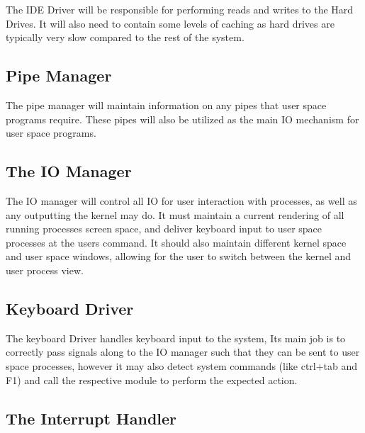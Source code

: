 \documentclass[a4paper]{report}
\begin{document}
The IDE Driver will be responsible for performing reads and writes to the Hard Drives. It will also need to contain some levels of caching as hard drives are typically very slow compared to the rest of the system.

\subsection{Pipe Manager}

The pipe manager will maintain information on any pipes that user space programs require. These pipes will also be utilized as the main IO mechanism for user space programs.

\subsection{The IO Manager}

The IO manager will control all IO for user interaction with processes, as well as any outputting the kernel may do. It must maintain a current rendering of all running processes screen space, and deliver keyboard input to user space processes at the users command. It should also maintain different kernel space and user space windows, allowing for the user to switch between the kernel and user process view.

\subsection{Keyboard Driver}

The keyboard Driver handles keyboard input to the system, Its main job is to correctly pass signals along to the IO manager such that they can be sent to user space processes, however it may also detect system commands (like ctrl+tab and F1) and call the respective module to perform the expected action.

\subsection{The Interrupt Handler}
\end{document}
